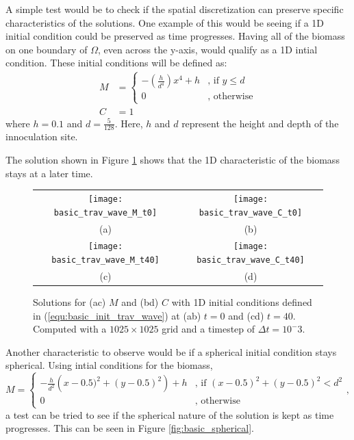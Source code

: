   A simple test would be to check if the spatial discretization can preserve specific characteristics of the solutions.
  One example of this would be seeing if a 1D initial condition could be preserved as time progresses.
  Having all of the biomass on one boundary of $\Omega$, even across the y-axis, would qualify as a 1D intial condition.
  These initial conditions will be defined as:
  \begin{equation} \label{equ:basic_init_trav_wave}
    \begin{aligned}
    M &= \begin{cases}
      -\left( \frac{h}{d^4} \right) x^4 + h & \text{, if } y \le d \\
      0 & \text{, otherwise}
    \end{cases} \\
    C &= 1
    \end{aligned}
  \end{equation}
  where $h = 0.1$ and $d = \frac{5}{128}$.
  Here, $h$ and $d$ represent the height and depth of the innoculation site. 

  The solution shown in Figure \ref{fig:basic_trav} shows that the 1D characteristic of the biomass stays at a later time. 

  \begin{figure}
    \centering
    \begin{tabular}{c c}
      \texttt{[image: basic\_trav\_wave\_M\_t0]} & 
      \texttt{[image: basic\_trav\_wave\_C\_t0]} \\
      (a) & (b) \\
      \texttt{[image: basic\_trav\_wave\_M\_t40]} &
      \texttt{[image: basic\_trav\_wave\_C\_t40]}\\
      (c) & (d)
    \end{tabular}
    \caption{Solutions for (ac) $M$ and (bd) $C$ with 1D initial conditions defined in (\ref{equ:basic_init_trav_wave}) at (ab) $t = 0$ and (cd) $t = 40$. Computed with a $1025 \times 1025$ grid and a timestep of $\Delta t = 10^-3$.}
    \label{fig:basic_trav}
  \end{figure}

  Another characteristic to observe would be if a spherical initial condition stays spherical.
  Using intial conditions for the biomass,
  \begin{equation} \label{equ:basic_spherical}
    M = \begin{cases}
      - \frac{h}{d^2} \left( x - 0.5)^2 + (y - 0.5)^2 \right) + h  & \text{, if } (x - 0.5)^2 + (y - 0.5)^2 < d^2 \\
      0 & \text{, otherwise}
    \end{cases},
  \end{equation}
  a test can be tried to see if the spherical nature of the solution is kept as time progresses.
  This can be seen in Figure \ref{fig:basic_spherical}.

